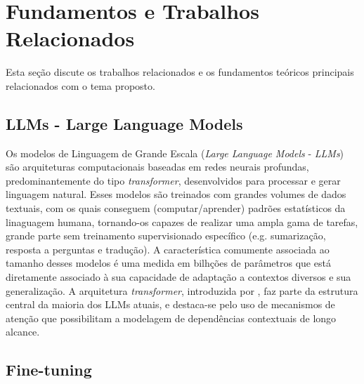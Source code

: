 \section{Fundamentos e Trabalhos Relacionados}

Esta seção discute os trabalhos relacionados e os fundamentos teóricos principais relacionados com o tema proposto.

\subsection{LLMs - Large Language Models}

Os modelos de Linguagem de Grande Escala (\textit{Large Language Models} - \textit{LLMs}) são arquiteturas computacionais baseadas em redes neurais profundas, predominantemente do tipo \textit{transformer}, desenvolvidos para processar e gerar linguagem natural. Esses modelos são treinados com grandes volumes de dados textuais, com os quais conseguem (computar/aprender) padrões estatísticos da linaguagem humana, tornando-os capazes de realizar uma ampla gama de tarefas, grande parte sem treinamento supervisionado específico (e.g. sumarização, resposta a perguntas e tradução). A característica comumente associada ao tamanho desses modelos é uma medida em bilhções de parâmetros que está diretamente associado à sua capacidade de adaptação a contextos diversos e sua generalização. A arquitetura \textit{transformer}, introduzida por \cite{vaswani2023transformers}, faz parte da estrutura central da maioria dos LLMs atuais, e destaca-se pelo uso de mecanismos de atenção que possibilitam a modelagem de dependências contextuais de longo alcance. 

\subsection{Fine-tuning}

